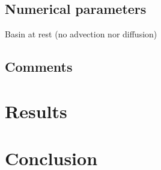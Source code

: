 \subsection{Numerical parameters}
%
Basin at rest (no advection nor diffusion)
%
\subsection{Comments}
%
%
%
\section{Results}
%

%
\section{Conclusion}
%

%
%
